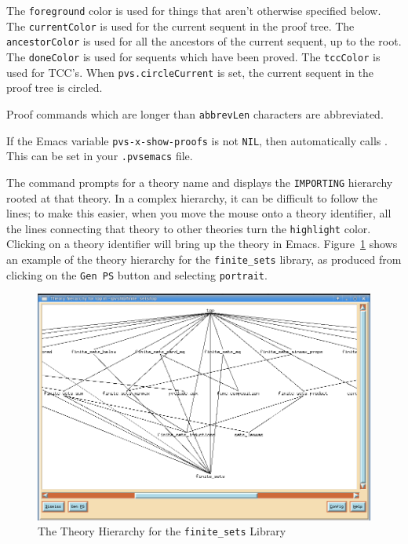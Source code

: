 The \texttt{foreground} color is used for things that aren't otherwise
specified below.  The \texttt{currentColor} is used for the current
sequent in the proof tree.  The \texttt{ancestorColor} is used for all
the ancestors of the current sequent, up to the root.  The
\texttt{doneColor} is used for sequents which have been proved.  The
\texttt{tccColor} is used for TCC's.  When \texttt{pvs.circle\-Current}
is set, the current sequent in the proof tree is circled.

Proof commands which are longer than \texttt{abbrevLen} characters are
abbreviated.

If the Emacs variable
\texttt{pvs-x-show-proofs}
is not \texttt{NIL}, then  automatically calls
.  This can be set in your
\texttt{.pvsemacs} file.

The  command prompts for a theory name and
displays the \texttt{IM\-PORTING} hierarchy rooted at that theory.  In a
complex hierarchy, it can be difficult to follow the lines; to make
this easier, when you move the mouse onto a theory identifier, all the
lines connecting that theory to other theories turn the
\texttt{highlight} color.  Clicking on a theory identifier will bring
up the theory in Emacs.  Figure~\ref{x-hierarchy} shows an example of the
theory hierarchy for the \texttt{finite\_sets} library, as produced from
clicking on the \texttt{Gen PS} button and selecting \texttt{portrait}.

\begin{figure}
\includegraphics[width=\textwidth]{finite_sets_top_hier.png}
\caption{The Theory Hierarchy for the \texttt{finite\_sets} Library}\label{x-hierarchy}
\end{figure}


